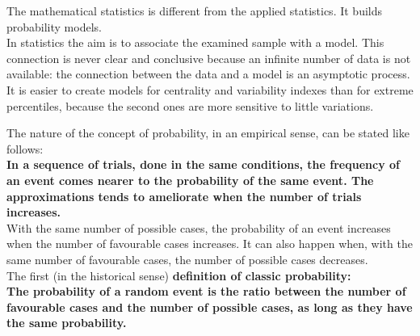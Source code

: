
\begin{frame}
  \vspace*{.5cm}
  The mathematical statistics is different from the applied statistics. It builds probability models.\\
  \vspace*{.5cm}
  In statistics the aim is to associate the examined sample with a model. This connection is never clear and conclusive because an infinite number of data is not available: the connection between the data and a model is an asymptotic process.\\
  \vspace*{.5cm}
  It is easier to create models for centrality and variability indexes than for extreme percentiles, because the second ones are more sensitive to little variations.
\end{frame}

\begin{frame}
  The nature of the concept of probability, in an empirical sense, can be stated like follows: \\
  \textbf{In a sequence of trials, done in the same conditions, the frequency of an event comes nearer to the probability of the same event. The approximations tends to ameliorate when the number of trials increases.}\\
  \vspace*{.2cm}
  With the same number of possible cases, the probability of an event increases when the number of favourable cases increases. It can also happen when, with the same number of favourable cases, the number of possible cases decreases. \\
  \vspace*{.2cm}
  The first (in the historical sense) \textbf{definition of classic probability:}\\
  \textbf{The probability of a random event is the ratio between the number of favourable cases and the number of possible cases, as long as they have the same probability.}\\
\end{frame}

